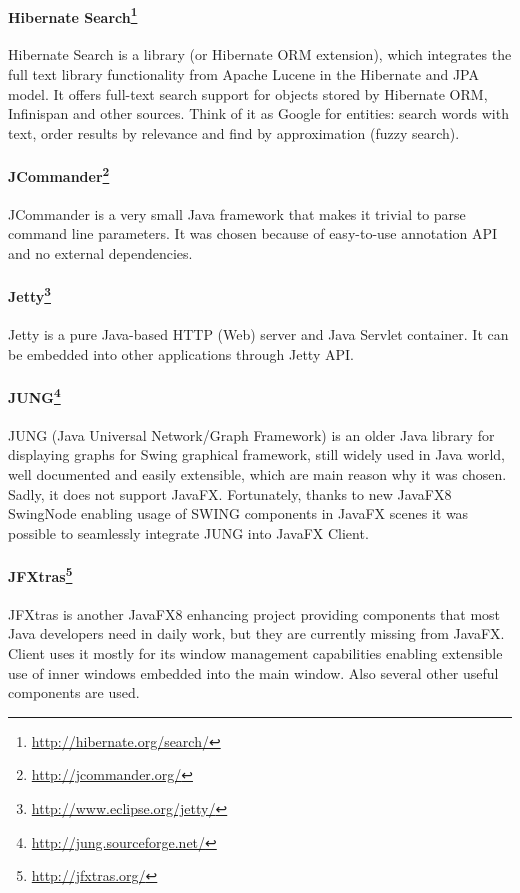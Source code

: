 \paragraph{Hibernate Search\footnote{\url{http://hibernate.org/search/}}}
Hibernate Search is a library (or Hibernate ORM extension), which integrates
the full text library functionality from Apache Lucene in the Hibernate and
JPA model. It offers full-text search support for objects stored by Hibernate
ORM, Infinispan and other sources. Think of it as Google\texttrademark{} for
entities: search words with text, order results by relevance and find by
approximation (fuzzy search).

\paragraph{JCommander\footnote{\url{http://jcommander.org/}}}
JCommander is a very small Java framework that makes it trivial to parse command
line parameters. It was chosen because of easy-to-use annotation API and no
external dependencies.

\paragraph{Jetty\footnote{\url{http://www.eclipse.org/jetty/}}}
Jetty is a pure Java-based HTTP (Web) server and Java Servlet container. It can
be embedded into other applications through Jetty API.

\paragraph{JUNG\footnote{\url{http://jung.sourceforge.net/}}}
JUNG (Java Universal Network/Graph Framework) is an older Java library for
displaying graphs for Swing graphical framework, still widely used in Java
world, well documented and easily extensible, which are main reason why it was
chosen. Sadly, it does not support JavaFX. Fortunately, thanks to new JavaFX8
SwingNode enabling usage of SWING components in JavaFX scenes it was possible to
seamlessly integrate JUNG into JavaFX \textan{} Client.

\paragraph{JFXtras\footnote{\url{http://jfxtras.org/}}}
JFXtras is another JavaFX8 enhancing project providing components that
most Java developers need in daily work, but they are currently missing
from JavaFX. \textan{} Client uses it mostly for its window management
capabilities enabling extensible use of inner windows embedded into the main
window. Also several other useful components are used.

